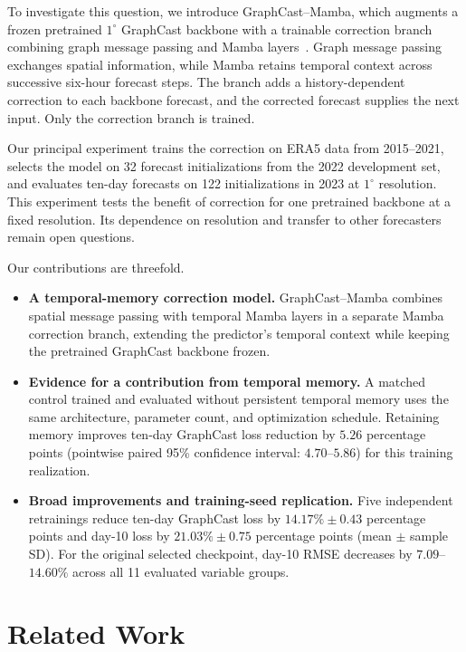 \documentclass{article}
\newcommand{\vfourchange}[1]{{\color{blue}#1}}
\begin{document}
{To investigate this question, we introduce GraphCast--Mamba, which augments a frozen pretrained $1^\circ$ GraphCast backbone with a trainable correction branch combining graph message passing and Mamba layers~\citep{lam2023graphcast,gu2023mamba}. Graph message passing exchanges spatial information, while Mamba retains temporal context across successive six-hour forecast steps. The branch adds a history-dependent correction to each backbone forecast, and the corrected forecast supplies the next input. Only the correction branch is trained.}

Our principal experiment trains the correction on ERA5 data from 2015--2021\vfourchange{, selects the model on 32 forecast initializations from the 2022 development set,} and evaluates ten-day forecasts on \vfourchange{122 initializations in 2023} at $1^\circ$ resolution. This experiment tests the benefit of correction for one pretrained backbone at a fixed resolution. Its dependence on resolution and transfer to other forecasters remain open questions.

Our contributions are threefold.
\begin{itemize}
    \item \textbf{A temporal-memory correction model.} GraphCast--Mamba combines spatial message passing with temporal Mamba layers in a separate Mamba correction branch, extending the predictor's temporal context while keeping the pretrained GraphCast backbone frozen.
    \item \textbf{Evidence for a contribution from temporal memory.} \vfourchange{A matched control trained and evaluated without persistent temporal memory uses the same architecture, parameter count, and optimization schedule. Retaining memory improves ten-day GraphCast loss reduction by $5.26$ percentage points (pointwise paired 95\% confidence interval: $4.70$--$5.86$) for this training realization.}
    \item \vfourchange{\textbf{Broad improvements and training-seed replication.} Five independent retrainings reduce ten-day GraphCast loss by $14.17\%\pm0.43$ percentage points and day-10 loss by $21.03\%\pm0.75$ percentage points (mean $\pm$ sample SD). For the original selected checkpoint, day-10 RMSE decreases by $7.09$--$14.60\%$ across all 11 evaluated variable groups.}
\end{itemize}
\vspace{-0.4cm}
\begingroup
\section{Related Work}
\label{sec:related_work}
\end{document}
